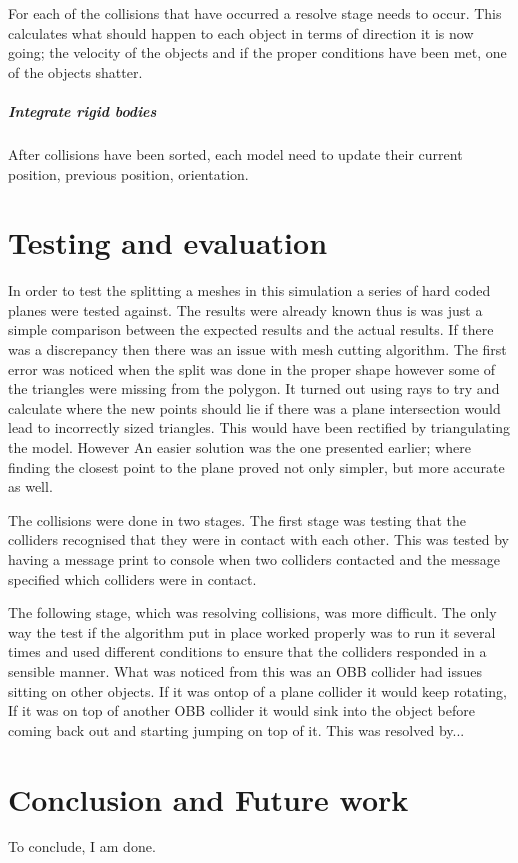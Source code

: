 \documentclass[conference,backref=page]{acmsiggraph}
\begin{document}
For each of the collisions that have occurred a resolve stage needs to occur. This calculates what should happen to each object in terms of direction it is now going; the velocity of the objects and if the proper conditions have been met, one of the objects shatter.
\subparagraph{Integrate rigid bodies}\hfill

After collisions have been sorted, each model need to update their current position, previous position, orientation.

\section{Testing and evaluation}

In order to test the splitting a meshes in this simulation a series of hard coded planes were tested against. The results were already known thus is was just a simple comparison between the expected results and the actual results. If there was a discrepancy then there was an issue with mesh cutting algorithm. The first error was noticed when the split was done in the proper shape however some of the triangles were missing from the polygon. It turned out using rays to try and calculate where the new points should lie if there was a plane intersection would lead to incorrectly sized triangles. This would have been rectified by triangulating the model. However An easier solution was the one presented earlier; where finding the closest point to the plane proved not only simpler, but more accurate as well.

The collisions were done in two stages. The first stage was testing that the colliders recognised that they were in contact with each other. This was tested by having a message print to console when two colliders contacted and the message specified which colliders were in contact. 

The following stage, which was resolving collisions, was more difficult. The only way the test if the algorithm put in place worked properly was to run it several times and used different conditions to ensure that the colliders responded in a sensible manner. What was noticed from this was an OBB collider had issues sitting on other objects. If it was ontop of a plane collider it would keep rotating, If it was on top of another OBB collider it would sink into the object before coming back out and starting jumping on top of it. This was resolved by...   


\section{Conclusion and Future work}
To conclude, I am done.
\end{document}
